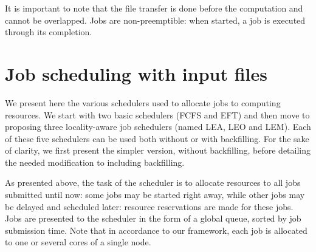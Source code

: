 \documentclass[conference,10pt]{IEEEtran}
\newcommand{\Node}[1]{\ensuremath{\mathrm{Node}_{#1}}\xspace}
\newcommand{\file}{\ensuremath{\mathit{File}}\xspace}
\newcommand{\size}{\ensuremath{\mathit{Size}}\xspace}
\newcommand{\bandwidth}{\mathit{BandWidth}\xspace}
\newcommand{\walltime}{\mathit{WallTime}\xspace}
\newcommand{\start}{\mathit{StartTime}\xspace}
\begin{document}
It is important to note that the file transfer is done before the computation and cannot be overlapped.
Jobs are non-preemptible: when started, a job is executed through its completion.


\section{Job scheduling with input files}\label{sec.schedulers}


We present here the various schedulers used to allocate jobs to
computing resources. We start with two basic schedulers (FCFS and EFT)
and then move to proposing three locality-aware job schedulers (named
LEA, LEO and LEM). Each of these five schedulers can be used both
without or with backfilling. For the sake of clarity, we first present
the simpler version, without backfilling, before detailing the needed
modification to including backfilling.

As presented above, the task of the scheduler is to allocate resources
to all jobs submitted until now: some jobs may be started right away,
while other jobs may be delayed and scheduled later: resource
reservations are made for these jobs. Jobs are presented to the
scheduler in the form of a global queue, sorted by job submission
time.  Note that in accordance to our framework, each job is allocated
to one or several cores of a single node.
\end{document}

